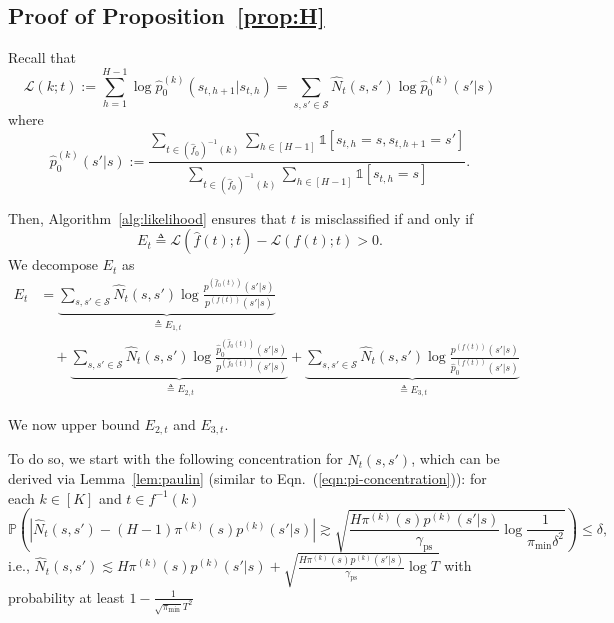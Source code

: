 \documentclass[twoside]{article}
\def\eqref#1{(\ref{#1})}
\def\gL{{\mathcal{L}}}
\def\gS{{\mathcal{S}}}
\def\sP{{\mathbb{P}}}
\theoremstyle{plain}
\def\bigabs#1{\left| #1 \right|}
\newcommand{\indicator}{\mathds{1}}
\newcommand{\ps}{\mathrm{ps}}
\begin{document}
\subsection{Proof of Proposition~\ref{prop:H}}
Recall that
\begin{equation}
    \gL(k; t) := \sum_{h=1}^{H-1} \log \widehat{p}_0^{(k)}(s_{t,h+1} | s_{t,h}) = \sum_{s, s' \in \gS} \widehat{N}_t(s, s') \log \widehat{p}_0^{(k)}(s' | s)
\end{equation}
where
\begin{equation}
    \widehat{p}_0^{(k)}(s' | s) := \frac{\sum_{t \in (\widehat{f}_0)^{-1}(k)} \sum_{h \in [H-1]} \indicator[s_{t,h} = s, s_{t,h+1} = s']}{\sum_{t \in (\widehat{f}_0)^{-1}(k)} \sum_{h \in [H-1]} \indicator[s_{t,h} = s]}.
\end{equation}

Then, Algorithm~\ref{alg:likelihood} ensures that $t$ is misclassified if and only if
\begin{equation}
    E_t \triangleq \gL(\widehat{f}(t); t) - \gL(f(t); t) > 0.
\end{equation}
We decompose $E_t$ as
\begin{align*}
    E_t &= \underbrace{\sum_{s, s' \in \gS} \widehat{N}_t(s, s') \log\frac{p^{(\widehat{f}_0(t))}(s' | s)}{p^{(f(t))}(s' | s)}}_{\triangleq E_{1,t}} \\
    &\quad + \underbrace{\sum_{s, s' \in \gS} \widehat{N}_t(s, s') \log\frac{\widehat{p}_0^{(\widehat{f}_0(t))}(s' | s)}{p^{(\widehat{f}_0(t))}(s' | s)}}_{\triangleq E_{2,t}} + \underbrace{\sum_{s, s' \in \gS} \widehat{N}_t(s, s') \log\frac{p^{(f(t))}(s' | s)}{\widehat{p}_0^{(f(t))}(s' | s)}}_{\triangleq E_{3,t}}
\end{align*}

We now upper bound $E_{2,t}$ and $E_{3,t}$.

To do so, we start with the following concentration for $\widehat{N}_t(s, s')$, which can be derived via Lemma~\ref{lem:paulin} (similar to Eqn.~\eqref{eqn:pi-concentration}):
for each $k \in [K]$ and $t \in f^{-1}(k)$
\begin{equation}
\label{eqn:pi-p-concentration}
    \sP\left( \bigabs{ \widehat{N}_t(s, s') - (H - 1) \pi^{(k)}(s) p^{(k)}(s' | s) } \gtrsim \sqrt{\frac{H \pi^{(k)}(s) p^{(k)}(s' | s)}{\gamma_\ps} \log\frac{1}{\pi_{\min} \delta^2} } \right) \leq \delta,
\end{equation}
i.e., $\widehat{N}_t(s, s') \lesssim H \pi^{(k)}(s) p^{(k)}(s' | s) + \sqrt{\frac{H \pi^{(k)}(s) p^{(k)}(s' | s)}{\gamma_\ps} \log T}$ with probability at least $1 - \frac{1}{\sqrt{\pi_{\min}} T^2}$
\end{document}
